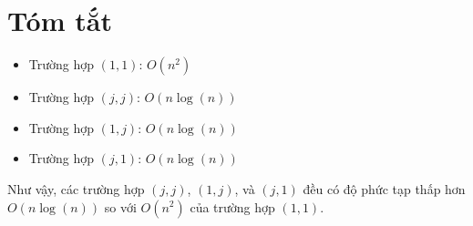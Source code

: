 \documentclass[12pt,a4paper]{article}
\begin{document}
\section*{Tóm tắt}
\begin{itemize}
    \item Trường hợp $(1,1)$: $O(n^2)$
    \item Trường hợp $(j,j)$: $O(n \log(n))$
    \item Trường hợp $(1,j)$: $O(n \log(n))$
    \item Trường hợp $(j,1)$: $O(n \log(n))$
\end{itemize}

Như vậy, các trường hợp $(j,j)$, $(1,j)$, và $(j,1)$ đều có độ phức tạp thấp hơn $O(n \log(n))$ so với $O(n^2)$ của trường hợp $(1,1)$.
\end{document}
